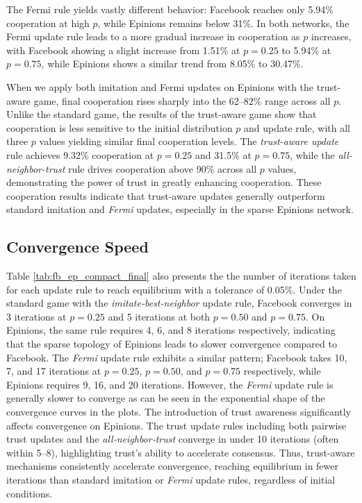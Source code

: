 The Fermi rule yields vastly different behavior: Facebook reaches only 5.94\% cooperation at high \(p\), while Epinions remains below 31\%. 
In both networks, the Fermi update rule leads to a more gradual increase in cooperation as \(p\) increases, with Facebook showing a slight increase from 1.51\% at \(p=0.25\) to 5.94\% at \(p=0.75\), while Epinions shows a similar trend from 8.05\% to 30.47\%.

When we apply both imitation and Fermi updates on Epinions with the trust-aware game, final cooperation rises sharply into the 62–82\% range across all \(p\). 
Unlike the standard game, the results of the trust-aware game show that cooperation is less sensitive to the initial distribution \(p\) and update rule, with all three \(p\) values yielding similar final cooperation levels.
The \emph{trust-aware update} rule achieves 9.32\% cooperation at \(p=0.25\) and 31.5\% at \(p=0.75\), while the \emph{all-neighbor-trust} rule drives cooperation above 90\% across all \(p\) values, demonstrating the power of trust in greatly enhancing cooperation.
These cooperation results indicate that trust-aware updates generally outperform standard imitation and \emph{Fermi} updates, especially in the sparse Epinions network.


\subsection{Convergence Speed}
Table \ref{tab:fb_ep_compact_final} also presents the the number of iterations taken for each update rule to reach equilibrium with a tolerance of 0.05\%.
Under the standard game with the \emph{imitate‐best‐neighbor} update rule, Facebook converges in 3 iterations at \(p=0.25\) and 5 iterations at both \(p=0.50\) and \(p=0.75\).
On Epinions, the same rule requires 4, 6, and 8 iterations respectively, indicating that the sparse topology of Epinions leads to slower convergence compared to Facebook.
The \emph{Fermi} update rule exhibits a similar pattern; Facebook takes 10, 7, and 17 iterations at \(p=0.25\), \(p=0.50\), and \(p=0.75\) respectively, 
while Epinions requires 9, 16, and 20 iterations. However, the \emph{Fermi} update rule is generally slower to converge as can be seen in the exponential shape of the convergence curves in the plots.
The introduction of trust awareness significantly affects convergence on Epinions. 
The trust update rules including both pairwise trust updates and the \emph{all‐neighbor‐trust} converge in under 10 iterations (often within 5–8), highlighting trust’s ability to accelerate consensus.
Thus, trust-aware mechanisms consistently accelerate convergence, reaching equilibrium in fewer iterations than standard imitation or \emph{Fermi} update rules, regardless of initial conditions.



